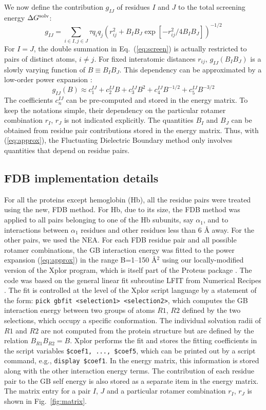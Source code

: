 \documentclass[a4paper,12pt]{article}
\begin{document}
We now define the contribution $g_{IJ}$ of residues $I$ and $J$ to the total screening energy $\Delta G^{\rm solv}$:
\begin{equation} 
g_{IJ} = \sum_{i \in I, j \in J} \tau q_i q_j \left( r_{ij}^2 + B_I B_J \exp[-r_{ij}^2/4 B_I B_J] \right)^{-1/2}
\label{eq:screen}
\end{equation}
For $I=J$, the double summation in Eq.\ (\ref{eq:screen}) is actually restricted to pairs of distinct atoms, $i \neq j$.
For fixed interatomic distances $r_{ij}$, $g_{IJ}(B_I B_J)$ is a slowly varying function of $B \equiv B_I B_J$. This
dependency can be approximated by a low-order power expansion \cite{Archontis05b}:
\begin{equation} 
g_{IJ}(B) \approx c_1^{IJ} + c_2^{IJ} B + c_3^{IJ} B^2 + c_4^{IJ} B^{-1/2} + c_5^{IJ} B^{-3/2}  \label{eq:approx}
\end{equation}
The coefficients $c_n^{IJ}$ can be pre-computed and stored in the energy matrix. To keep the notations simple, their
dependency on the particular rotamer combination $r_I$, $r_J$ is not indicated explicitly. The quantities $B_I$ and
$B_J$ can be obtained from residue pair contributions stored in the energy matrix. Thus, with (\ref{eq:approx}), the
Fluctuating Dielectric Boundary method only involves quantities that depend on residue pairs. 

\subsection{FDB implementation details}
For all the proteins except hemoglobin (Hb), all the residue pairs were treated using the new, FDB method. For Hb, due to
its size, the FDB method was applied to all pairs belonging to one of the Hb subunits, say $\alpha_1$, and to interactions
between $\alpha_1$ residues and other residues less than 6 {\AA} away. For the other pairs, we used the NEA. For each FDB
residue pair and all possible rotamer combinations, the GB interaction energy was fitted to the power expansion
(\ref{eq:approx}) in the range B=1--150 {\AA}$^2$ using our locally-modified version of the Xplor program, which is itself
part of the Proteus package \cite{Simonson13b}. The code was based on the general linear fit subroutine LFIT from Numerical
Recipes \cite{PressBK,Archontis05b}. The fit is controlled at the level of the Xplor script language \cite{Xplor} by a
statement of the form: \verb_pick gbfit <selection1> <selection2>_, which computes the GB interaction energy between
two groups of atoms $R1$, $R2$ defined by the two selections, which occupy a specific conformation. The individual solvation
radii of $R1$ and $R2$ are not computed from the protein structure but are defined by the relation $B_{R1} B_{R2} = B$.
Xplor performs the fit and stores the fitting coefficients in the script variables \verb_$coef1, ..., $coef5_, which can
be printed out by a script command, e.g., \verb_display $coef1_. In the energy matrix, this information is stored along
with the other interaction energy terms. The contribution of each residue pair to the GB self energy is also stored as a
separate item in the energy matrix. The matrix entry for a pair $I$, $J$ and a particular rotamer combination $r_I$, $r_J$
is shown in Fig.\ \ref{fig:matrix}.
\end{document}
